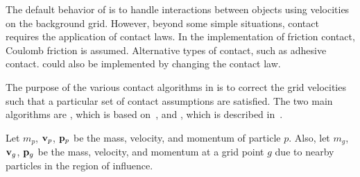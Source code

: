 The default behavior of \MPM is to handle interactions between objects using velocities on
the background grid.  However, beyond some simple situations, contact requires the application
of contact laws.  In the \Vaango implementation of friction contact, Coulomb friction is
assumed.  Alternative types of contact, such as adhesive contact. could also be implemented by
changing the contact law.

The purpose of the various contact algorithms in \Vaango is to correct the grid velocities
such that a particular set of contact assumptions are satisfied.  The two main algorithms
are , which is based on~\cite{Bard2001}, and ,
which is described in~\cite{Nairn2020}.

Let $m_p$, $\mathbf{v}_p$, $\mathbf{p}_p$ be the mass, velocity, and momentum of particle $p$. Also, let $m_g$,
$\mathbf{v}_g$, $\mathbf{p}_g$ be the mass, velocity, and momentum at a grid point $g$ due to nearby particles
in the region of influence.

